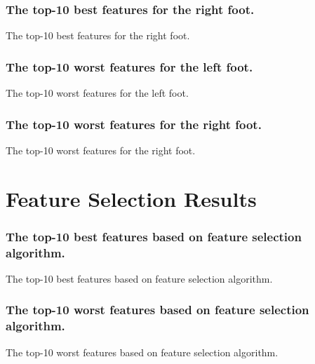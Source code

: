\documentclass{beamer}
\begin{document}
\begin{frame}[shrink=10]
\frametitle{The top-10 best features for the right foot.}
\tiny
\begin{table}
\centering
\caption{\small The top-10 best features for the right foot.}

\end{table}
\end{frame}

\begin{frame}[shrink=10]
\frametitle{The top-10 worst features for the left foot.}
\tiny
\begin{table}
\centering
\caption{\small The top-10 worst features for the left foot.}

\end{table}
\end{frame}

\begin{frame}[shrink=10]
\frametitle{The top-10 worst features for the right foot.}
\tiny
\begin{table}
\centering
\caption{\small The top-10 worst features for the right foot.}

\end{table}
\end{frame}


\section{Feature Selection Results}
\begin{frame}[shrink=10]
\frametitle{The top-10 best features based on feature selection algorithm.}
\tiny
\begin{table}
\centering
\caption{\small The top-10 best features based on feature selection algorithm.}

\end{table}
\end{frame}

\begin{frame}[shrink=10]
\frametitle{The top-10 worst features based on feature selection algorithm.}
\tiny
\begin{table}
\centering
\caption{\small The top-10 worst features based on feature selection algorithm.}

\end{table}
\end{frame}
\end{document}
